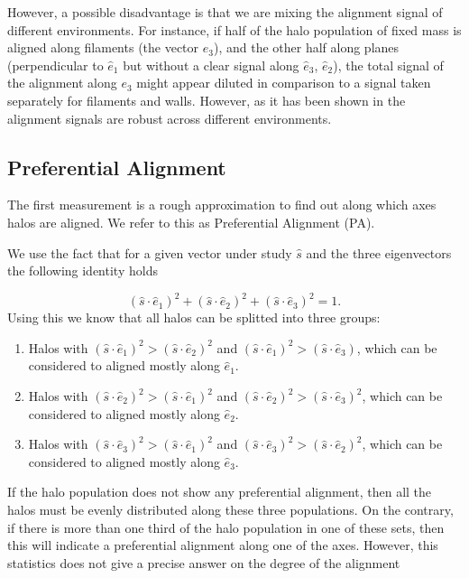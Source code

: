 \documentclass[useAMS,usenatbib]{mn2e}
\begin{document}
However, a possible disadvantage is that we are mixing the alignment signal
of different environments. For instance, if half of the halo population of
fixed mass is aligned along filaments (the vector $\hat{e}_3$), and the
other half along planes (perpendicular to $\hat{e}_1$ but without a
clear signal along $\hat{e}_3$, $\hat{e}_2$), the total signal of the
alignment along $e_3$ might appear diluted in comparison to a signal
taken separately for filaments and walls. However, as it has been
shown in \cite{Libeskind2013} the alignment signals are robust across
different environments. 


\subsection{Preferential Alignment}

The first measurement is a rough approximation to find out along which
axes halos are aligned. We refer to this as Preferential Alignment (PA).

We use the fact that for a given vector under study $\hat{s}$ and the
three eigenvectors the following identity holds 
 
\begin{equation}
(\hat{s}\cdot\hat{e}_1)^2 +(\hat{s}\cdot\hat{e}_2)^2 +(\hat{s}\cdot\hat{e}_3)^2 =1.
\end{equation}
%
Using this we know that all halos can be splitted into three groups:

\begin{enumerate}
\item Halos with $(\hat{s}\cdot\hat{e}_1)^2> (\hat{s}\cdot\hat{e}_2)^2$
  and $(\hat{s}\cdot\hat{e}_1)^2> (\hat{s}\cdot\hat{e}_3)$, which can
  be considered to aligned mostly along $\hat{e}_1$.
\item Halos with $(\hat{s}\cdot\hat{e}_2)^2> (\hat{s}\cdot\hat{e}_1)^2$
  and $(\hat{s}\cdot\hat{e}_2)^2> (\hat{s}\cdot\hat{e}_3)^2$, which can
  be considered to aligned mostly along $\hat{e}_2$.
\item Halos with $(\hat{s}\cdot\hat{e}_3)^2> (\hat{s}\cdot\hat{e}_1)^2$
  and $(\hat{s}\cdot\hat{e}_3)^2> (\hat{s}\cdot\hat{e}_2)^2$, which can
  be considered to aligned mostly along $\hat{e}_3$.
\end{enumerate}

If the halo population does not show any preferential alignment, then
all the halos must be evenly distributed along these three
populations. On the contrary, if there is more than one third of the
halo population in one of these sets, then this will indicate a
preferential alignment along one of the axes. However, this statistics
does not give a precise answer on the degree of the alignment
\end{document}
